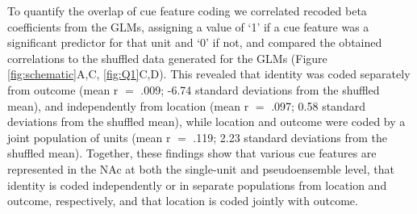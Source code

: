 \documentclass[11pt]{article}
\providecommand{\DIFadd}[1]{{\protect\color{red} \sf #1}} %
\providecommand{\DIFdel}[1]{} %
\providecommand{\DIFaddbegin}{} %
\providecommand{\DIFaddend}{} %
\providecommand{\DIFdelbegin}{} %
\providecommand{\DIFdelend}{} %
\newcommand{\DIFscaledelfig}{0.5}
\newlength{\DIFdelgraphicswidth} %
\newlength{\DIFdelgraphicsheight} %
\newcommand{\DIFaddincludegraphics}[2][]{{\color{red}\fbox{\DIFOincludegraphics[#1]{#2}}}} %
\newcommand{\DIFdelincludegraphics}[2][]{%
\sbox{\DIFdelgraphicsbox}{\DIFOincludegraphics[#1]{#2}}%
\settoboxwidth{\DIFdelgraphicswidth}{\DIFdelgraphicsbox} %
\settoboxtotalheight{\DIFdelgraphicsheight}{\DIFdelgraphicsbox} %
\scalebox{\DIFscaledelfig}{%
\parbox[b]{\DIFdelgraphicswidth}{\usebox{\DIFdelgraphicsbox}\\[-\baselineskip] \rule{\DIFdelgraphicswidth}{0em}}\llap{\resizebox{\DIFdelgraphicswidth}{\DIFdelgraphicsheight}{%
\setlength{\unitlength}{\DIFdelgraphicswidth}%
\begin{picture}(1,1)%
\thicklines\linethickness{2pt} %
{\color[rgb]{1,0,0}\put(0,0){\framebox(1,1){}}}%
{\color[rgb]{1,0,0}\put(0,0){\line( 1,1){1}}}%
{\color[rgb]{1,0,0}\put(0,1){\line(1,-1){1}}}%
\end{picture}%
}\hspace*{3pt}}} %
} %
\DeclareRobustCommand{\DIFaddbegin}{\DIFOaddbegin \let\includegraphics\DIFaddincludegraphics} %
\DeclareRobustCommand{\DIFaddend}{\DIFOaddend \let\includegraphics\DIFOincludegraphics} %
\DeclareRobustCommand{\DIFdelbegin}{\DIFOdelbegin \let\includegraphics\DIFdelincludegraphics} %
\DeclareRobustCommand{\DIFdelend}{\DIFOaddend \let\includegraphics\DIFOincludegraphics} %
\begin{document}
\DIFadd{To quantify the overlap of cue feature coding we correlated recoded beta coefficients from the GLMs, assigning a value of `1' if a cue feature was a significant predictor for that unit and `0' if not, and compared the obtained correlations to the shuffled data generated for the GLMs (Figure \ref{fig:schematic}A,C, \ref{fig:Q1}C,}\DIFaddend D). \DIFdelbegin \DIFdel{Units
that were modulated by cue outcome showed a ramping of activity after cue-onset
for their preferred cue type. Additionally, units that exhibited a decrease in
firing in response to the cue and whose activity was modulated by cue outcome ,
showed a sustained discriminatory response to reward-available and
reward-unavailable cues that extended beyond cue-onset (Figure
\ref{fig:pop}F}\DIFdelend \DIFaddbegin \DIFadd{This revealed that identity was coded separately from outcome (mean r  $=$ .009; -6.74 standard deviations from the shuffled mean), and independently from location (mean r  $=$ .097;  0.58 standard deviations from the shuffled mean), while location and outcome were coded by a joint population of units (mean r  $=$ .119;  2.23 standard deviations from the shuffled mean}\DIFaddend ). Together, these \DIFdelbegin \DIFdel{visualizations of the averaged population
responses revealed nuanced differences in the way NAc units are modulated by cue
conditions across cue features}\DIFdelend \DIFaddbegin \DIFadd{findings show that various cue features are represented in the NAc at both the single-unit and pseudoensemble level, that identity is coded independently or in separate populations from location and outcome, respectively, and that location is coded jointly with outcome}\DIFaddend .
\end{document}
